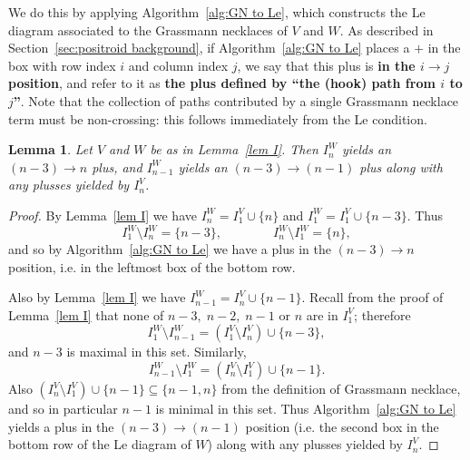 \documentclass[11pt]{article}
\newtheorem{lem}[thm]{Lemma}
\theoremstyle{remark}
\theoremstyle{definition}
\begin{document}
We do this by applying Algorithm~\ref{alg:GN to Le}, which constructs the Le diagram associated to the Grassmann necklaces of $V$ and $W$. As described in Section~\ref{sec:positroid background}, if Algorithm~\ref{alg:GN to Le} places a $+$ in the box with row index $i$ and column index $j$, we say that this plus is {\bf in the $i \rightarrow j$ position}, and refer to it as {\bf the plus defined by ``the (hook) path from $i$ to $j$''}. Note that the collection of paths contributed by a single Grassmann necklace term must be non-crossing: this follows immediately from the Le condition.






\begin{lem}\label{lem n and n-1}
Let $V$ and $W$ be as in Lemma~\ref{lem I}.
Then
%
  $I_n^W$ yields an $(n-3)\rightarrow n$ plus, and $I_{n-1}^W$ yields an $(n-3)\rightarrow (n-1)$ plus along with any plusses yielded by $I_n^V$.
\end{lem}

\begin{proof}
By Lemma~\ref{lem I} we have $I_n^{W}= I_1^{V} \cup \{n\}$ and $I_1^{W} = I_1^{V} \cup \{n-3\}$. Thus 
\[I_1^{W} \setminus I_n^{W} = \{n-3\}, \qquad \qquad I_n^{W} \setminus I_1^{W} = \{n\},\]
and so by Algorithm~\ref{alg:GN to Le} we have a plus in the $(n-3) \rightarrow n$ position, i.e. in the leftmost box of the bottom row. 

Also by Lemma~\ref{lem I} we have $I_{n-1}^{W} = I_n^{V} \cup \{n-1\}$. Recall from the proof of Lemma~\ref{lem I} that none of $n-3,\;n-2,\;n-1$ or $n$ are in $I_1^V$; therefore
\[
I_1^W\setminus I_{n-1}^W = (I_1^V \setminus I_n^V) \cup\{n-3\},
\]
and $n-3$ is maximal in this set. Similarly, 
\[I_{n-1}^W \setminus I_1^W = (I_n^V \setminus I_1^V) \cup \{n-1\}.
\]
Also $(I_n^V \setminus I_1^V) \cup \{n-1\}\subseteq \{n-1,n\}$ from the definition of Grassmann necklace, and so in particular $n-1$ is minimal in this set. Thus Algorithm~\ref{alg:GN to Le} yields a plus in the $(n-3) \rightarrow (n-1)$ position (i.e. the second box in the bottom row of the Le diagram of $W$) along with any plusses yielded by $I_n^V$.
\end{proof} 
\end{document}
